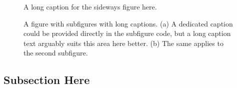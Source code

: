 \kant[9-15]


\begin{sidewaysfigure}
\centering
    \figbox{\rule{.1pt}{5cm} \rule[2.5cm]{13cm}{.1pt} \rule{.1pt}{5cm}}
	\caption[Sideways figure example]{A long caption for the sideways figure here.}%
	\label{fig:introduction-example-sideways}%
\end{sidewaysfigure}

\begin{figure}[t!]
	\begin{subfigure}[t]{0.477\linewidth}
			\centering
			\figbox{\rule{.1pt}{2cm} \rule[1cm]{2cm}{.1pt} \rule{.1pt}{2cm}}
			\caption{}%
	\end{subfigure}%
	\hspace{3pt}
	\begin{subfigure}[t]{0.4754\linewidth}
			\centering
			\figbox{\rule{.1pt}{2cm} \rule[1cm]{2cm}{.1pt} \rule{.1pt}{2cm}}
			\caption{}%
	\end{subfigure}%
	\caption[Short caption for a figure with subfigures]{A figure with subfigures with long captions. 
	(a) A dedicated caption could be provided directly in the subfigure code, but a long caption text arguably suits this area here better. 
    (b) The same applies to the second subfigure.
	}%
	\label{fig:intro-subfigures}%
\end{figure} 


\subsection{Subsection Here}\label{subsec:intro-subsection}

